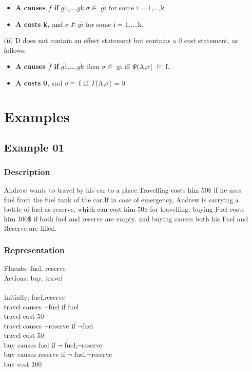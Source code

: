 \documentclass[11pt]{article}
\begin{document}
\begin{itemize}
	\item {\bfseries A causes $\overline{f}$ if} $\overline{g1}$,...,$\overline{gk}$,$\sigma \nvDash$  $\overline{gi}$ for some i = 1,...,k

	\item {\bfseries A costs k,} and $\sigma \nvDash \overline{gi}$ for some i = 1,...,k.
\end{itemize}
(ii) D does not contain an effect statement but contains a 0 cost statement, as follows:
\begin{itemize}
\item {\bfseries A causes $\overline{f}$ if} $\overline{g1}$,...,$\overline{gk}$ then $\sigma \nvDash$  gi iff $\Psi$(A,$\sigma$) $\vDash$ f.

\item {\bfseries A costs 0}, and $\sigma \vDash$ f iff $\Gamma$(A,$\sigma$) = 0.
\end{itemize}

	\section{Examples}\label{sec:Examples}
	\subsection{Example 01}\label{example:ex01}
	\subsubsection{Description}\label{par:p101}
	Andrew wants to travel by his car to a place.Travelling costs him 50\$ if he uses fuel from the fuel tank of the car.If in case of emergency, Andrew is carrying a bottle of fuel as reserve, which can cost him 50\$ for travelling. buying Fuel costs him 100\$ if both fuel and reserve are empty. and buying causes both his Fuel and Reserve are filled. 
	\subsubsection{Representation}\label{par:p201}
	Fluents: fuel, reserve\\
	Actions: buy, travel\\
	\\
	Initially:  fuel,reserve \\
	travel causes $\neg$fuel if fuel \\
	travel cost 50 \\
	travel causes $\neg$reserve if $\neg$fuel\\
	travel cost 50 \\
	buy causes fuel if $\neg$ fuel,$\neg$reserve\\
	buy causes reserve if $\neg$ fuel,$\neg$reserve\\
	buy cost 100 \\
\end{document}
